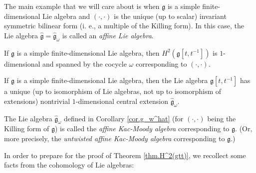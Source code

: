 \documentclass[etingof-lie.tex]{subfiles}
\begin{document}
The main example that we will care about is when $\mathfrak{g}$ is a simple
finite-dimensional Lie algebra and $\left(  \cdot,\cdot\right)  $ is the
unique (up to scalar) invariant symmetric bilinear form (i. e., a multiple of
the Killing form). In this case, the Lie algebra $\widehat{\mathfrak{g}%
}=\widehat{\mathfrak{g}}_{\omega}$ is called an \textit{affine Lie algebra}.

\begin{theorem}
\label{thm.H^2(gtt)}If $\mathfrak{g}$ is a simple finite-dimensional Lie
algebra, then $H^{2}\left(  \mathfrak{g}\left[  t,t^{-1}\right]  \right)  $ is
$1$-dimensional and spanned by the cocycle $\omega$ corresponding to $\left(
\cdot,\cdot\right)  $.
\end{theorem}

\begin{corollary}
\label{cor.g_w^hat}If $\mathfrak{g}$ is a simple finite-dimensional Lie
algebra, then the Lie algebra $\mathfrak{g}\left[  t,t^{-1}\right]  $ has a
unique (up to isomorphism of Lie algebras, not up to isomorphism of
extensions) nontrivial $1$-dimensional central extension
$\widehat{\mathfrak{g}}_{\omega}$.
\end{corollary}

\begin{definition}
\label{def.kac}The Lie algebra $\widehat{\mathfrak{g}}_{\omega}$ defined in
Corollary \ref{cor.g_w^hat} (for $\left(  \cdot,\cdot\right)  $ being the
Killing form of $\mathfrak{g}$) is called the \textit{affine Kac-Moody
algebra} corresponding to $\mathfrak{g}$. (Or, more precisely, the
\textit{untwisted affine Kac-Moody algebra} corresponding to $\mathfrak{g}$.)
\end{definition}

In order to prepare for the proof of Theorem \ref{thm.H^2(gtt)}, we recollect
some facts from the cohomology of Lie algebras:
\end{document}
